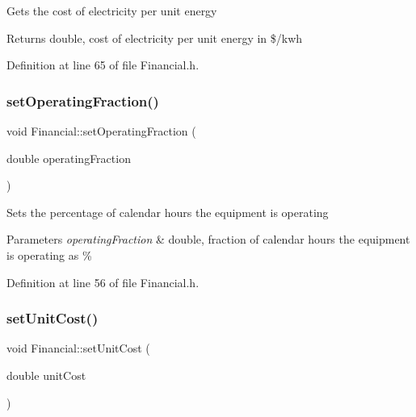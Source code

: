 Gets the cost of electricity per unit energy

\begin{DoxyReturn}{Returns}
double, cost of electricity per unit energy in \$/kwh 
\end{DoxyReturn}


Definition at line 65 of file Financial.\+h.

\mbox{\label{class_financial_a966250111b2f7a00d797a9d153ee8a83}} 
\subsubsection{\texorpdfstring{set\+Operating\+Fraction()}{setOperatingFraction()}}
{\footnotesize\ttfamily void Financial\+::set\+Operating\+Fraction (\begin{DoxyParamCaption}\item[{double}]{operating\+Fraction }\end{DoxyParamCaption})\hspace{0.3cm}{\ttfamily [inline]}}

Sets the percentage of calendar hours the equipment is operating


\begin{DoxyParams}{Parameters}
{\em operating\+Fraction} & double, fraction of calendar hours the equipment is operating as \% \\
\hline
\end{DoxyParams}


Definition at line 56 of file Financial.\+h.

\mbox{\label{class_financial_a84ead2ef72b2d348e05eb308d01e9265}} 
\subsubsection{\texorpdfstring{set\+Unit\+Cost()}{setUnitCost()}}
{\footnotesize\ttfamily void Financial\+::set\+Unit\+Cost (\begin{DoxyParamCaption}\item[{double}]{unit\+Cost }\end{DoxyParamCaption})\hspace{0.3cm}{\ttfamily [inline]}}

